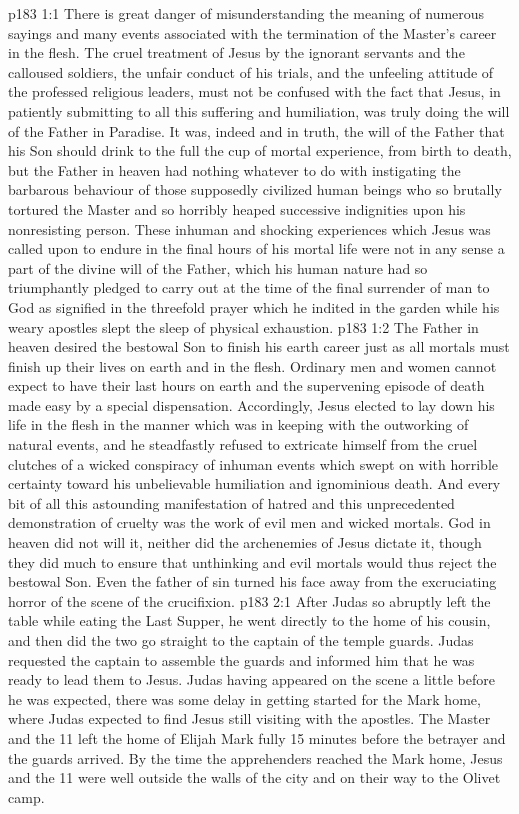 \vs p183 1:1 There is great danger of misunderstanding the meaning of numerous sayings and many events associated with the termination of the Master’s career in the flesh. The cruel treatment of Jesus by the ignorant servants and the calloused soldiers, the unfair conduct of his trials, and the unfeeling attitude of the professed religious leaders, must not be confused with the fact that Jesus, in patiently submitting to all this suffering and humiliation, was truly doing the will of the Father in Paradise. It was, indeed and in truth, the will of the Father that his Son should drink to the full the cup of mortal experience, from birth to death, but the Father in heaven had nothing whatever to do with instigating the barbarous behaviour of those supposedly civilized human beings who so brutally tortured the Master and so horribly heaped successive indignities upon his nonresisting person. These inhuman and shocking experiences which Jesus was called upon to endure in the final hours of his mortal life were not in any sense a part of the divine will of the Father, which his human nature had so triumphantly pledged to carry out at the time of the final surrender of man to God as signified in the threefold prayer which he indited in the garden while his weary apostles slept the sleep of physical exhaustion.
\vs p183 1:2 The Father in heaven desired the bestowal Son to finish his earth career  just as all mortals must finish up their lives on earth and in the flesh. Ordinary men and women cannot expect to have their last hours on earth and the supervening episode of death made easy by a special dispensation. Accordingly, Jesus elected to lay down his life in the flesh in the manner which was in keeping with the outworking of natural events, and he steadfastly refused to extricate himself from the cruel clutches of a wicked conspiracy of inhuman events which swept on with horrible certainty toward his unbelievable humiliation and ignominious death. And every bit of all this astounding manifestation of hatred and this unprecedented demonstration of cruelty was the work of evil men and wicked mortals. God in heaven did not will it, neither did the archenemies of Jesus dictate it, though they did much to ensure that unthinking and evil mortals would thus reject the bestowal Son. Even the father of sin turned his face away from the excruciating horror of the scene of the crucifixion.
\vs p183 2:1 After Judas so abruptly left the table while eating the Last Supper, he went directly to the home of his cousin, and then did the two go straight to the captain of the temple guards. Judas requested the captain to assemble the guards and informed him that he was ready to lead them to Jesus. Judas having appeared on the scene a little before he was expected, there was some delay in getting started for the Mark home, where Judas expected to find Jesus still visiting with the apostles. The Master and the 11 left the home of Elijah Mark fully 15 minutes before the betrayer and the guards arrived. By the time the apprehenders reached the Mark home, Jesus and the 11 were well outside the walls of the city and on their way to the Olivet camp.
